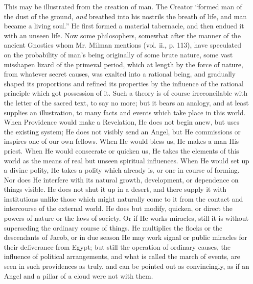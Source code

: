 This may be illustrated from the creation of man.
The Creator ``formed man of the dust of the ground, \emph{and} breathed
into his nostrils the breath of life, and man became a living soul.''
He first formed a material tabernacle, and then endued it with an
unseen life. Now some philosophers, somewhat after the manner of the
ancient Gnostics whom Mr. Milman mentions (vol. ii., p. 113), have
speculated on the probability of man's being originally of some brute
nature, some vast misshapen lizard of the primeval period, which at
length by the force of nature, from whatever secret causes, was
exalted into a rational being, and gradually shaped its proportions
and refined its properties by the influence of the rational principle
which got possession of it. Such a theory is of course irreconcilable
with the letter of the sacred text, to say no more; but it bears an
analogy, and at least supplies an illustration, to many facts and
events which take place in this world. When Providence would make a
Revelation, He does not begin anew, but uses the existing system; He
does not visibly send an Angel, but He commissions or inspires one of
our own fellows. When He would bless us, He makes a man His priest.
When He would consecrate or quicken us, He takes the elements of this
world as the means of real but unseen spiritual influences. When He
would set up a divine polity, He takes a polity which already is, or
one in course of forming. Nor does He interfere with its natural
growth, development, or dependence on things visible. He does not shut
it up in a desert, and there supply it with institutions unlike those
which might naturally come to it from the contact and intercourse of
the external world. He does but modify, quicken, or direct the powers
of nature or the laws of society. Or if He works miracles, still it is
without superseding the ordinary course of things. He multiplies the
flocks or the descendants of Jacob, or in due season He may work
signal or public miracles for their deliverance from Egypt; but still
the operation of ordinary causes, the influence of political
arrangements, and what is called the march of events, are seen in such
providences as truly, and can be pointed out as convincingly, as if an
Angel and a pillar of a cloud were not with them.

